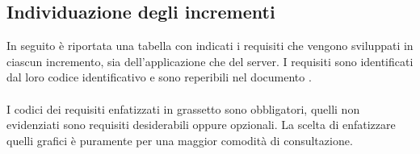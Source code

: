 \subsection{Individuazione degli incrementi}
In seguito è riportata una tabella con indicati i requisiti che vengono sviluppati in ciascun incremento, sia dell'applicazione che del server.
I requisiti sono identificati dal loro codice identificativo e sono reperibili nel documento \AdR{}.\\
\\I codici dei requisiti enfatizzati in grassetto sono obbligatori, quelli non evidenziati sono requisiti desiderabili oppure opzionali.
La scelta di enfatizzare quelli grafici è puramente per una maggior comodità di consultazione.

